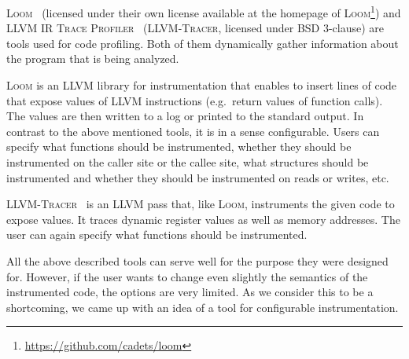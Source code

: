 \textsc{Loom}~\cite{loom} (licensed under their own license available at the
homepage of \textsc{Loom}\footnote{\url{https://github.com/cadets/loom}}) and
\textsc{LLVM IR Trace Profiler}~\cite{tracer} (\textsc{LLVM-Tracer}, licensed
under BSD 3-clause) are tools used for code profiling. Both of them dynamically
gather information about the program that is being analyzed.

\textsc{Loom} is an LLVM library for instrumentation that enables to insert
lines of code that expose values of LLVM instructions (e.g.~return values of
function calls). The values are then written to a log or printed to the
standard output. In contrast to the above mentioned tools, it is in a sense
configurable. Users can specify what functions should be instrumented, whether
they should be instrumented on the caller site or the callee site, what
structures should be instrumented and whether they should be instrumented on
reads or writes, etc.

\textsc{LLVM-Tracer}~\cite{tracer} is an LLVM pass that, like \textsc{Loom},
instruments the given code to expose values. It traces dynamic register values
as well as memory addresses. The user can again specify what functions should
be instrumented.

All the above described tools can serve well for the purpose they were designed
for. However, if the user wants to change even slightly the semantics of the
instrumented code, the options are very limited. As we consider this to be
a shortcoming, we came up with an idea of a tool for configurable
instrumentation.
